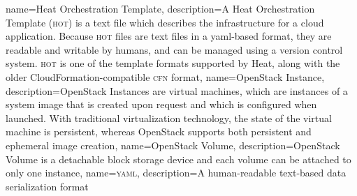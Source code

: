 {
  name={Heat Orchestration Template},
  description={A \gls{Heat} Orchestration Template (\textsc{hot}) is a text
  file which describes the infrastructure for a cloud application.
  Because \textsc{hot} files are text files in a \gls{yaml}-based format, they
  are readable and writable by humans, and can be managed using a
  version control system.  \textsc{hot} is one of the template formats
  supported by Heat, along with the older CloudFormation-compatible
  \textsc{cfn} format},
}
{
  name={OpenStack Instance},
  description={OpenStack Instances are virtual machines, which are
  instances of a system image that is created upon request and which
  is configured when launched. With traditional virtualization
  technology, the state of the virtual machine is persistent, whereas
  OpenStack supports both persistent and ephemeral image creation},
}
{
  name={OpenStack Volume},
  description={OpenStack Volume is a detachable block storage device
  and each volume can be attached to only one instance},
}
{
  name={\textsc{yaml}},
  description={A human-readable text-based data serialization
  format}
}
